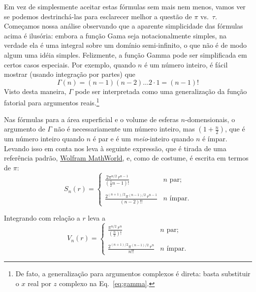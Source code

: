 Em vez de simplesmente aceitar estas fórmulas sem mais nem menos, vamos ver se podemos destrinchá-las para esclarecer melhor a questão de $\pi$ vs.~$\tau$. Começamos nossa análise observando que a aparente simplicidade das fórmulas acima é ilusória: embora a função Gama seja notacionalmente simples, na verdade ela é uma integral sobre um domínio semi-infinito, o que não é de modo algum uma idéia simples. Felizmente, a função Gamma pode ser simplificada em certos casos especiais. Por exemplo, quando $n$ é um número inteiro, é fácil mostrar (usando integração por partes) que
\[
\Gamma(n) = (n-1)(n-2)\ldots 2\cdot 1 = (n-1)!
\]
Visto desta maneira, $\Gamma$ pode ser interpretada como uma generalização da função fatorial para argumentos reais.\footnote{De fato, a generalização para argumentos complexos é direta: basta substituir o $x$ real por $z$ complexo na Eq.~\eqref{eq:gamma}.} 

Nas fórmulas para a área superficial e o volume de esferas $n$-domensionais, o argumento de $\Gamma$ não é necessariamente um número inteiro, mas $\left(1 + \frac{n}{2}\right)$, que é um número inteiro quando $n$ é par e é um \emph{meio}-inteiro quando $n$ é ímpar. Levando isso em conta nos leva à seguinte expressão, que é tirada de uma referência padrão, \href{https://mathworld.wolfram.com/Hypersphere.html}{Wolfram MathWorld}, e, como de costume, é escrita em termos de $\pi$:
\begin{equation}
\label{eq:surface_area_mathworld}
S_n(r) = \begin{cases}
\displaystyle \frac{2\pi^{n/2}\,r^{n-1}}{(\frac{1}{2}n - 1)!} & n \text{ par}; \\ \\
 \displaystyle \frac{2^{(n+1)/2}\pi^{(n-1)/2}\,r^{n-1}}{(n-2)!!} & n \text{ ímpar}.
\end{cases}
\end{equation}

Integrando com relação a $r$ leva a
\begin{equation}
\label{eq:volume_mathworld}
V_n(r) = \begin{cases}
\displaystyle \frac{\pi^{n/2}\,r^n}{(\frac{n}{2})!} & n \text{ par}; \\ \\
\displaystyle \frac{2^{(n+1)/2}\pi^{(n-1)/2}\,r^n}{n!!} & n \text{ ímpar}.
\end{cases}
\end{equation}

